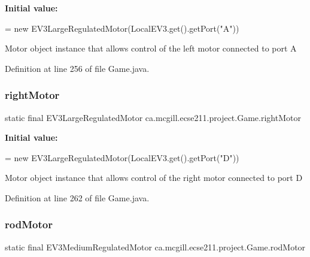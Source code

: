 {\bfseries Initial value\+:}
\begin{DoxyCode}
=
      \textcolor{keyword}{new} EV3LargeRegulatedMotor(LocalEV3.get().getPort(\textcolor{stringliteral}{"A"}))
\end{DoxyCode}
Motor object instance that allows control of the left motor connected to port A 

Definition at line 256 of file Game.\+java.

\mbox{\label{enumca_1_1mcgill_1_1ecse211_1_1project_1_1_game_a7a05fcf37c4435c32270776a427ba0d2}} 
\subsubsection{\texorpdfstring{right\+Motor}{rightMotor}}
{\footnotesize\ttfamily  static  final E\+V3\+Large\+Regulated\+Motor ca.\+mcgill.\+ecse211.\+project.\+Game.\+right\+Motor\hspace{0.3cm}{\ttfamily [static]}}

{\bfseries Initial value\+:}
\begin{DoxyCode}
=
      \textcolor{keyword}{new} EV3LargeRegulatedMotor(LocalEV3.get().getPort(\textcolor{stringliteral}{"D"}))
\end{DoxyCode}
Motor object instance that allows control of the right motor connected to port D 

Definition at line 262 of file Game.\+java.

\mbox{\label{enumca_1_1mcgill_1_1ecse211_1_1project_1_1_game_aeb41e5234fcb3b311385f39a07a24a54}} 
\subsubsection{\texorpdfstring{rod\+Motor}{rodMotor}}
{\footnotesize\ttfamily  static  final E\+V3\+Medium\+Regulated\+Motor ca.\+mcgill.\+ecse211.\+project.\+Game.\+rod\+Motor\hspace{0.3cm}{\ttfamily [static]}}

